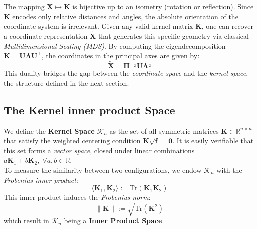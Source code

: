 \documentclass[11pt]{article}
\begin{document}
	The mapping $\mathbf{X} \mapsto \mathbf{K}$ is bijective up to an isometry (rotation or reflection). Since $\mathbf{K}$ encodes only relative distances and angles, the absolute orientation of the coordinate system is irrelevant. Given any valid kernel matrix $\mathbf{K}$, one can recover a coordinate representation $\tilde{\mathbf{X}}$ that generates this specific geometry via classical \emph{Multidimensional Scaling (MDS)}. By computing the eigendecomposition $\mathbf{K} = \mathbf{U} \bm{\Lambda} \mathbf{U}^\top$, the coordinates in the principal axes are given by:
	\begin{equation}
		\tilde{\mathbf{X}} = \bm{\Pi}^{-\frac{1}{2}} \mathbf{U} \bm{\Lambda}^{\frac{1}{2}}
	\end{equation}
	This duality bridges the gap between the \emph{coordinate space} and the \emph{kernel space}, the structure defined in the next section.
	
	
	\subsection{The Kernel inner product Space}
	
	We define the \textbf{Kernel Space} $\mathcal{K}_n$ as the set of all symmetric matrices $\mathbf{K} \in \mathbb{R}^{n \times n}$ that satisfy the weighted centering condition $\mathbf{K} \sqrt{\mathbf{f}} = \mathbf{0}$. It is easily verifiable that this set forms a \emph{vector space}, closed under linear combinations $a \mathbf{K}_1 + b \mathbf{K}_2, \; \forall a, b \in \mathbb{R}$. \\
	
	To measure the similarity between two configurations, we endow $\mathcal{K}_n$ with the \emph{Frobenius inner product}:
	\begin{equation}
		\langle \mathbf{K}_1, \mathbf{K}_2 \rangle := \text{Tr}(\mathbf{K}_1 \mathbf{K}_2)
	\end{equation}
	This inner product induces the \emph{Frobenius norm}:
	\begin{equation}
		\|\mathbf{K}\| := \sqrt{\text{Tr}(\mathbf{K}^2)}
	\end{equation}
	which result in $\mathcal{K}_n$ being a \textbf{Inner Product Space}. \\
	
\end{document}
